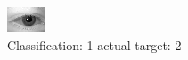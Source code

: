 \begin{figure}[h!]
\begin{center}
\includegraphics[width=0.60\columnwidth]{figures/ID361_class_1_target_2.png}
\end{center}
\caption{ Classification: 1 actual target: 2}
\label{fig:ID361_class_1_target_2}
\end{figure}
